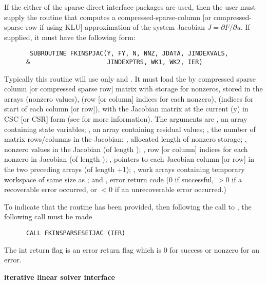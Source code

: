 \begin{Steps}
  If the either of the sparse direct interface packages are used, 
  then the user must supply the  routine
  that computes a compressed-sparse-column [or compressed-sparse-row if using KLU]
  approximation of the system Jacobian $J = \partial F / \partial u$.
  If supplied, it must have the following form:
\begin{verbatim}
       SUBROUTINE FKINSPJAC(Y, FY, N, NNZ, JDATA, JINDEXVALS, 
      &                     JINDEXPTRS, WK1, WK2, IER)
\end{verbatim}
  Typically this routine will use only  and 
  . It must load the  by  
  compressed sparse column  [or compressed sparse row] matrix 
  with storage for  nonzeros, stored in the arrays  (nonzero
  values),  (row [or column] indices for each nonzero),  (indices 
  for start of each column [or row]), with the Jacobian matrix at the current
  (y) in CSC [or CSR] form (see  for more information).
 The arguments are , an array containing state variables; , an
 array containing residual values; , the number of matrix rows/columns 
 in the Jacobian; , allocated length of nonzero storage; ,
 nonzero values in the Jacobian (of length ); 
 , row [or column] indices for each nonzero in Jacobian (of length );
 , pointers to each Jacobian column [or row] in the two preceding arrays
 (of length +1); , work arrays containing temporary workspace 
 of same size as ; and , error return code (0 if successful,
 $>0$ if a recoverable error occurred, or $<0$ if an unrecoverable error occurred.)

  To indicate that the  routine has been provided, then
  following the call to , the
  following call must be made    
\begin{verbatim}
      CALL FKINSPARSESETJAC (IER)
\end{verbatim}
  The int return flag  is an error return flag which is $0$
  for success or nonzero for an error.

  
  {\bf {\kinspils} iterative linear solver interface}
  

\end{Steps}
